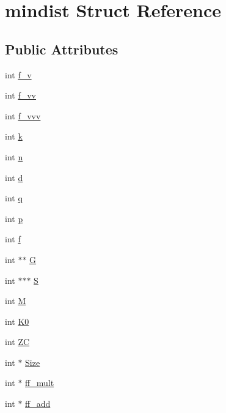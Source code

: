 \hypertarget{structmindist}{}\section{mindist Struct Reference}
\label{structmindist}
\subsection*{Public Attributes}
\begin{DoxyCompactItemize}
\item 
int \mbox{\hyperlink{structmindist_a570d9abe9d5dfaa69b4af94611222581}{f\+\_\+v}}
\item 
int \mbox{\hyperlink{structmindist_a13267946118f2bd57db37652bdc82c52}{f\+\_\+vv}}
\item 
int \mbox{\hyperlink{structmindist_a4f606f2271120fb7cdcabb198577a2ae}{f\+\_\+vvv}}
\item 
int \mbox{\hyperlink{structmindist_a84e0c843955350170ac8c0fdc31e0d36}{k}}
\item 
int \mbox{\hyperlink{structmindist_a5ded3fd9ae47397d5c15859dcf78d652}{n}}
\item 
int \mbox{\hyperlink{structmindist_a906e5b460f74fcf5ca40007b4bf9ac07}{d}}
\item 
int \mbox{\hyperlink{structmindist_ab16e5f14b58df5d60e275bb5789518a8}{q}}
\item 
int \mbox{\hyperlink{structmindist_aba808e79e4dbaf47f941510d6e65eabe}{p}}
\item 
int \mbox{\hyperlink{structmindist_aa3ee8ecb10ecb9ce7487e221728155b0}{f}}
\item 
int $\ast$$\ast$ \mbox{\hyperlink{structmindist_a0a348e6e77012fc5f35f8fc0575d131d}{G}}
\item 
int $\ast$$\ast$$\ast$ \mbox{\hyperlink{structmindist_a592136f71e4bd62610c6b6ed16a6dada}{S}}
\item 
int \mbox{\hyperlink{structmindist_aac9e0c6b28cdd96afef91f5e32ce8fb4}{M}}
\item 
int \mbox{\hyperlink{structmindist_a7be51e7eb9205088af0b144d92683a01}{K0}}
\item 
int \mbox{\hyperlink{structmindist_a7864f64929fe652c51d4f3ab73d2ea5f}{ZC}}
\item 
int $\ast$ \mbox{\hyperlink{structmindist_aa4e85b41408a5061b3f8bdef1c0284ad}{Size}}
\item 
int $\ast$ \mbox{\hyperlink{structmindist_ae31191b2a8e60378c2bbcdf63414498f}{ff\+\_\+mult}}
\item 
int $\ast$ \mbox{\hyperlink{structmindist_aa321f8f012e06852e03cf34d04577e66}{ff\+\_\+add}}
$$
\end{DoxyCompactItemize}
